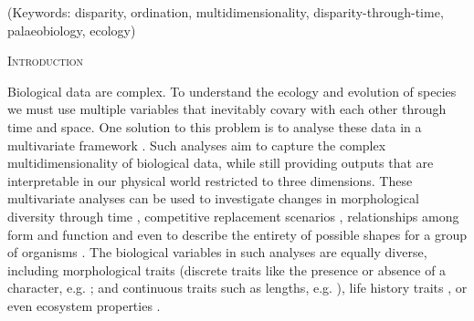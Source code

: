 \documentclass[12pt,letterpaper]{article}
\renewcommand{\section}[1]{%
\bigskip
\begin{center}
\begin{Large}
\normalfont\scshape #1
\medskip
\end{Large}
\end{center}}
\begin{document}
\noindent (Keywords: disparity, ordination, multidimensionality, disparity-through-time, palaeobiology, ecology)\\

\vspace{1.5in}

\newpage 

%
%

\section{Introduction}

Biological data are complex.
To understand the ecology and evolution of species we must use multiple variables that inevitably covary with each other through time and space.
One solution to this problem is to analyse these data in a multivariate framework \citep[e.g.][]{price2015predation,diaz2016global}.
Such analyses aim to capture the complex multidimensionality of biological data, while still providing outputs that are interpretable in our physical world restricted to three dimensions.
These multivariate analyses can be used to investigate changes in morphological diversity through time \citep{Close2015}, competitive replacement scenarios \citep{Brusatte12092008}, relationships among form and function \citep{diaz2016global} and even to describe the entirety of possible shapes for a group of organisms \citep{raup1966geometric}.
The biological variables in such analyses are equally diverse, including morphological traits (discrete traits like the presence or absence of a character, e.g. \citealt{brusattedinosaur2012}; and continuous traits such as lengths, e.g. \citealt{price2015predation}), life history traits \citep[e.g.][]{diaz2016global}, or even ecosystem properties \citep[e.g.][]{DonohueDim}. 
\end{document}
